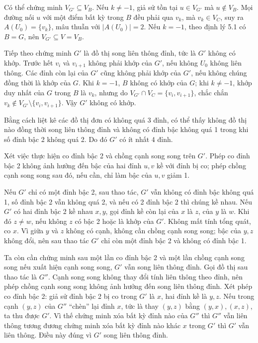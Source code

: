 \documentclass[11pt]{article}
\begin{document}
Có thể chứng minh \(V_{G'}\subseteq V_B\). Nếu \(k\ne-1\), giả sử tồn tại
\(u\in V_{G'}\) mà \(u\notin V_B\). Mọi đường nối \(u\) với một điểm bất kỳ
trong \(B\) đều phải qua \(v_k\), mà \(v_k\in V_C\), suy ra
\(A(U_0)=\{v_k\}\), mâu thuẫn với \(|A(U_0)|=2\). Nếu \(k=-1\), theo định lý
5.1 có \(B=G\), nên \(V_{G'}\subseteq V=V_B\).

Tiếp theo chứng minh \(G'\) là đồ thị song liên thông đỉnh, tức là \(G'\)
không có khớp. Trước hết \(v_i\) và \(v_{i+1}\) không phải khớp của \(G'\),
nếu không \(U_0\) không liên thông. Các đỉnh còn lại của \(G'\) cũng không
phải khớp của \(G'\), nếu không chúng đồng thời là khớp của \(G\). Khi
\(k=-1\), \(B\) không có khớp của \(G\); khi \(k\ne-1\), khớp duy nhất của
\(G\) trong \(B\) là \(v_k\), nhưng do \(V_{G'}\cap V_C=\{v_i,v_{i+1}\}\), chắc
chắn \(v_k\notin V_{G'}\setminus\{v_i,v_{i+1}\}\). Vậy \(G'\) không có khớp.

Bằng cách liệt kê các đồ thị đơn có không quá 3 đỉnh, có thể thấy không đồ thị
nào đồng thời song liên thông đỉnh và không có đỉnh bậc không quá 1 trong khi
số đỉnh bậc 2 không quá 2. Do đó \(G'\) có ít nhất 4 đỉnh.

Xét việc thực hiện co đỉnh bậc 2 và chồng cạnh song song trên \(G'\). Phép co
đỉnh bậc 2 không ảnh hưởng đến bậc của hai đỉnh \(u,v\) kề với đỉnh bị co;
phép chồng cạnh song song sau đó, nếu cần, chỉ làm bậc của \(u,v\) giảm 1.

Nếu \(G'\) chỉ có một đỉnh bậc 2, sau thao tác, \(G'\) vẫn không có đỉnh bậc
không quá 1, số đỉnh bậc 2 vẫn không quá 2, và nếu có 2 đỉnh bậc 2 thì chúng
kề nhau. Nếu \(G'\) có hai đỉnh bậc 2 kề nhau \(x,y\), gọi đỉnh kề còn lại
của \(x\) là \(z\), của \(y\) là \(w\). Khi đó \(z\ne w\), nếu không \(z\) có
bậc 2 hoặc là khớp của \(G'\). Không mất tính tổng quát, co \(x\). Vì giữa
\(y\) và \(z\) không có cạnh, không cần chồng cạnh song song; bậc của \(y,z\)
không đổi, nên sau thao tác \(G'\) chỉ còn một đỉnh bậc 2 và không có đỉnh bậc
1.

Ta còn cần chứng minh sau một lần co đỉnh bậc 2 và một lần chồng cạnh song
song nếu xuất hiện cạnh song song, \(G'\) vẫn song liên thông đỉnh. Gọi đồ thị
sau thao tác là \(G''\). Cạnh song song không thay đổi tính liên thông theo
đỉnh, nên phép chồng cạnh song song không ảnh hưởng đến song liên thông đỉnh.
Xét phép co đỉnh bậc 2: giả sử đỉnh bậc 2 bị co trong \(G'\) là \(x\), hai
đỉnh kề là \(y,z\). Nếu trong cạnh \((y,z)\) của \(G''\) ``chèn'' lại đỉnh
\(x\), tức là thay \((y,z)\) bằng \((y,x),(x,z)\), ta thu được \(G'\). Vì thế
chứng minh xóa bất kỳ đỉnh nào của \(G''\) thì \(G''\) vẫn liên thông tương
đương chứng minh xóa bất kỳ đỉnh nào khác \(x\) trong \(G'\) thì \(G'\) vẫn
liên thông. Điều này đúng vì \(G'\) song liên thông đỉnh.
\end{document}
